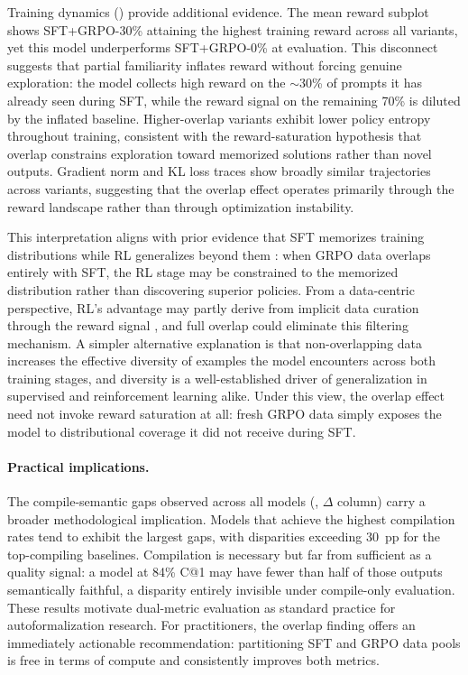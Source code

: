 \documentclass[11pt,a4paper]{article}
\begin{document}
Training dynamics () provide additional evidence. The mean reward subplot shows SFT+GRPO-30\% attaining the highest training reward across all variants, yet this model underperforms SFT+GRPO-0\% at evaluation. This disconnect suggests that partial familiarity inflates reward without forcing genuine exploration: the model collects high reward on the ${\sim}$30\% of prompts it has already seen during SFT, while the reward signal on the remaining 70\% is diluted by the inflated baseline. Higher-overlap variants exhibit lower policy entropy throughout training, consistent with the reward-saturation hypothesis that overlap constrains exploration toward memorized solutions rather than novel outputs. Gradient norm and KL loss traces show broadly similar trajectories across variants, suggesting that the overlap effect operates primarily through the reward landscape rather than through optimization instability.

This interpretation aligns with prior evidence that SFT memorizes training distributions while RL generalizes beyond them \citep{chu2025sftmemorizes}: when GRPO data overlaps entirely with SFT, the RL stage may be constrained to the memorized distribution rather than discovering superior policies. From a data-centric perspective, RL's advantage may partly derive from implicit data curation through the reward signal \citep{lu2026datacentric}, and full overlap could eliminate this filtering mechanism. A simpler alternative explanation is that non-overlapping data increases the effective diversity of examples the model encounters across both training stages, and diversity is a well-established driver of generalization in supervised and reinforcement learning alike. Under this view, the overlap effect need not invoke reward saturation at all: fresh GRPO data simply exposes the model to distributional coverage it did not receive during SFT.

\paragraph{Practical implications.}
The compile-semantic gaps observed across all models (, $\Delta$ column) carry a broader methodological implication. Models that achieve the highest compilation rates tend to exhibit the largest gaps, with disparities exceeding 30~pp for the top-compiling baselines. Compilation is necessary but far from sufficient as a quality signal: a model at 84\% C@1 may have fewer than half of those outputs semantically faithful, a disparity entirely invisible under compile-only evaluation. These results motivate dual-metric evaluation as standard practice for autoformalization research. For practitioners, the overlap finding offers an immediately actionable recommendation: partitioning SFT and GRPO data pools is free in terms of compute and consistently improves both metrics.
\end{document}
